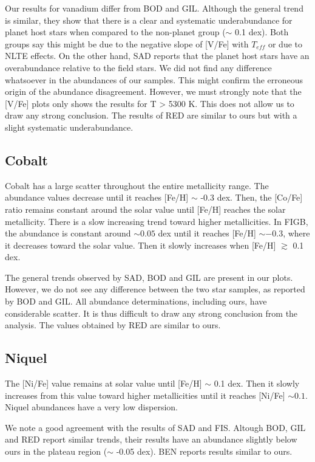 \documentclass[dvips,12pt,a4paper]{report}
\begin{document}
{{Our results for vanadium differ from BOD and GIL. Although the general trend is similar, they show that there is a clear and systematic underabundance for planet host stars when compared to the non-planet group ($\sim$ 0.1 dex). Both groups say this might be due to the negative slope of [V/Fe] with $T_{eff}$ or due to NLTE effects. On the other hand, SAD reports that the planet host stars have an overabundance relative to the field stars. We did not find any difference whatsoever in the abundances of our samples. This might confirm the erroneous origin of the abundance disagreement. However, we must strongly note that the [V/Fe] plots only shows the results for T > 5300 K. This does not allow us to draw any strong conclusion. The results of RED are similar to ours but with a slight systematic underabundance.

\subsection {Cobalt}

Cobalt has a large scatter throughout the entire metallicity range. The abundance values decrease until it reaches [Fe/H] $\sim$ -0.3 dex. Then, the [Co/Fe] ratio remains constant around the solar value until [Fe/H] reaches the solar metallicity. There is a slow increasing trend toward higher metallicities. In FIGB, the abundance is constant around $\sim 0.05$ dex until it reaches [Fe/H] $\sim -0.3$, where it decreases toward the solar value. Then it slowly increases when [Fe/H] $\gtrsim$ 0.1 dex.

The general trends observed by SAD, BOD and GIL are present in our plots. However, we do not see any difference between the two star samples, as reported by BOD and GIL. All abundance determinations, including ours, have considerable scatter. It is thus difficult to draw any strong conclusion from the analysis. The values obtained by RED are similar to ours.


\subsection{Niquel}

The [Ni/Fe] value remains at solar value until [Fe/H] $\sim$ 0.1 dex. Then it slowly increases from this value toward higher metallicities until it reaches [Ni/Fe] $\sim 0.1$. Niquel abundances have a very low dispersion.

We note a good agreement with the results of SAD and FIS. Altough BOD, GIL and RED report similar trends, their results have an  abundance slightly below ours in the plateau region ($\sim$ -0.05 dex). BEN reports results similar to ours.



}}
\end{document}
